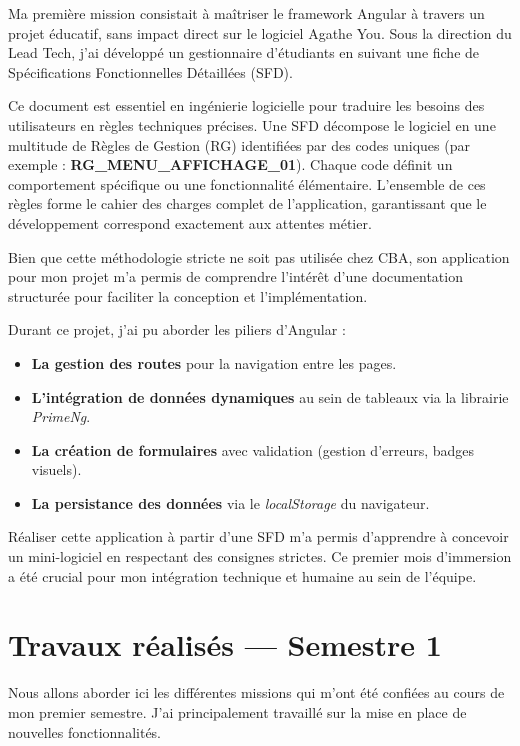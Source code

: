 \documentclass{article}
\begin{document}
Ma première mission consistait à maîtriser le framework Angular à travers un projet éducatif, sans impact direct sur le logiciel Agathe You. Sous la direction du Lead Tech, j'ai développé un gestionnaire d'étudiants en suivant une fiche de Spécifications Fonctionnelles Détaillées (SFD).

Ce document est essentiel en ingénierie logicielle pour traduire les besoins des utilisateurs en règles techniques précises. Une SFD décompose le logiciel en une multitude de Règles de Gestion (RG) identifiées par des codes uniques (par exemple : \textbf{RG\_MENU\_AFFICHAGE\_01}). Chaque code définit un comportement spécifique ou une fonctionnalité élémentaire. L'ensemble de ces règles forme le cahier des charges complet de l'application, garantissant que le développement correspond exactement aux attentes métier.

Bien que cette méthodologie stricte ne soit pas utilisée chez CBA, son application pour mon projet m'a permis de comprendre l'intérêt d'une documentation structurée pour faciliter la conception et l'implémentation.

Durant ce projet, j'ai pu aborder les piliers d'Angular :

\begin{itemize}
    \item \textbf{La gestion des routes} pour la navigation entre les pages.
    \item \textbf{L'intégration de données dynamiques} au sein de tableaux via la librairie \textit{PrimeNg}.
    \item \textbf{La création de formulaires} avec validation (gestion d'erreurs, badges visuels).
    \item \textbf{La persistance des données} via le \textit{localStorage} du navigateur.
\end{itemize}

Réaliser cette application à partir d'une SFD m'a permis d'apprendre à concevoir un mini-logiciel en respectant des consignes strictes. Ce premier mois d'immersion a été crucial pour mon intégration technique et humaine au sein de l'équipe.

\section{Travaux réalisés --- Semestre 1}

Nous allons aborder ici les différentes missions qui m'ont été confiées au cours de mon premier semestre. J'ai principalement travaillé sur la mise en place de nouvelles fonctionnalités.
\end{document}
